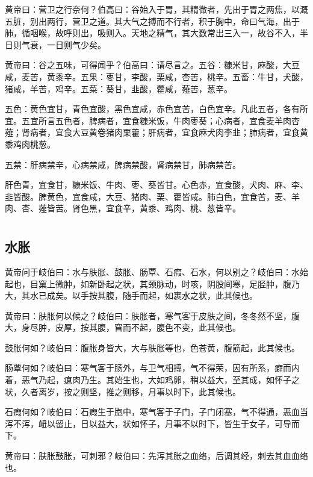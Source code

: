 \documentclass[a4paper,12pt,UTF8,twoside]{ctexbook}
\begin{document}
	黄帝曰：营卫之行奈何？伯高曰：谷始入于胃，其精微者，先出于胃之两焦，以溉五脏，别出两行，营卫之道。其大气之搏而不行者，积于胸中，命曰气海，出于肺，循咽喉，故呼则出，吸则入。天地之精气，其大数常出三入一，故谷不入，半日则气衰，一日则气少矣。
	
	黄帝曰：谷之五味，可得闻乎？伯高曰：请尽言之。五谷：糠米甘，麻酸，大豆咸，麦苦，黄黍辛。五果：枣甘，李酸，栗咸，杏苦，桃辛。五畜：牛甘，犬酸，猪咸，羊苦，鸡辛。五菜：葵甘，韭酸，藿咸，薤苦，葱辛。
	
	五色：黄色宜甘，青色宜酸，黑色宜咸，赤色宜苦，白色宜辛。凡此五者，各有所宜。五宜所言五色者，脾病者，宜食糠米饭，牛肉枣葵；心病者，宜食麦羊肉杏薤；肾病者，宜食大豆黄卷猪肉栗藿；肝病者，宜食麻犬肉李韭；肺病者，宜食黄黍鸡肉桃葱。
	
	五禁：肝病禁辛，心病禁咸，脾病禁酸，肾病禁甘，肺病禁苦。
	
	肝色青，宜食甘，糠米饭、牛肉、枣、葵皆甘。心色赤，宜食酸，犬肉、麻、李、韭皆酸。脾黄色，宜食咸，大豆、猪肉、栗、藿皆咸。肺白色，宜食苦，麦、羊肉、杏、薤皆苦。肾色黑，宜食辛，黄黍、鸡肉、桃、葱皆辛。
	
	\part{}
	\chapter{水胀}
	
	黄帝问于岐伯曰：水与肤胀、鼓胀、肠覃、石瘕、石水，何以别之？岐伯曰：水始起也，目窠上微肿，如新卧起之状，其颈脉动，时咳，阴股间寒，足胫肿，腹乃大，其水已成矣。以手按其腹，随手而起，如裹水之状，此其候也。
	
	黄帝曰：肤胀何以候之？岐伯曰：肤胀者，寒气客于皮肤之间，冬冬然不坚，腹大，身尽肿，皮厚，按其腹，窅而不起，腹色不变，此其候也。
	
	鼓胀何如？岐伯曰：腹胀身皆大，大与肤胀等也，色苍黄，腹筋起，此其候也。
	
	肠覃何如？岐伯曰：寒气客于肠外，与卫气相搏，气不得荣，因有所系，癖而内着，恶气乃起，瘜肉乃生。其始生也，大如鸡卵，稍以益大，至其成，如怀子之状，久者离岁，按之则坚，推之则移，月事以时下，此其候也。
	
	石瘕何如？岐伯曰：石瘕生于胞中，寒气客于子门，子门闭塞，气不得通，恶血当泻不泻，衄以留止，日以益大，状如怀子，月事不以时下，皆生于女子，可导而下。
	
	黄帝曰：肤胀鼓胀，可刺邪？岐伯曰：先泻其胀之血络，后调其经，刺去其血血络也。
	
\end{document}
